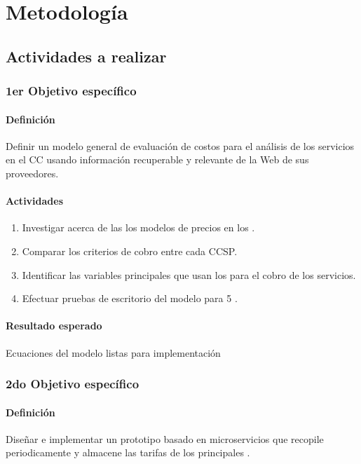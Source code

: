 
\chapter{Metodología} %

\label{ch:metodologia} %
\section{Actividades a realizar}

\subsection{1er Objetivo específico}
\subsubsection{Definición}
Definir un modelo general de evaluación de costos para el análisis de los servicios en el \acrshort{CC} usando información recuperable y relevante de la Web de sus proveedores.
\subsubsection{Actividades}
\begin{enumerate}
    \item Investigar acerca de las los modelos de precios en los .
    \item Comparar los criterios de cobro entre cada \acrshort{CCSP}.
    \item Identificar las variables principales que usan los  para el cobro de los servicios.
    \item Efectuar pruebas de escritorio del modelo para 5 .
\end{enumerate}
\subsubsection{Resultado esperado}
Ecuaciones del modelo listas para implementación

\subsection{2do Objetivo específico}
\subsubsection{Definición}
Diseñar e implementar un prototipo basado en microservicios que recopile periodicamente y almacene las tarifas de los principales .
